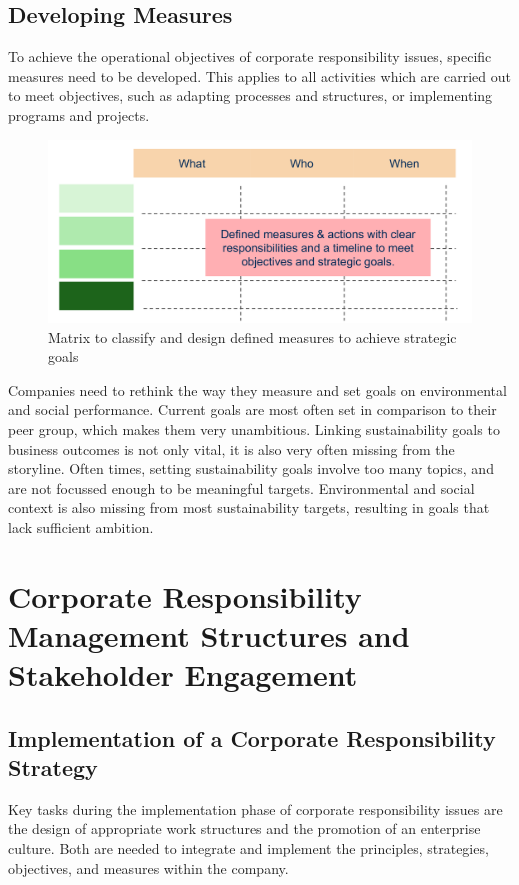 \documentclass[11pt]{article}
\theoremstyle{definition}
\begin{document}
\clearpage
\subsection{Developing Measures}
To achieve the operational objectives of corporate responsibility issues, specific measures need to be developed. This applies to all activities which are carried out to meet objectives, such as adapting processes and structures, or implementing programs and projects.
\begin{figure}[H]
	\centering
	\includegraphics[width=0.7\linewidth]{img/developing_achievable_measures}
	\caption{Matrix to classify and design defined measures to achieve strategic goals}
	\label{fig:developingachievablemeasures}
\end{figure}
Companies need to rethink the way they measure and set goals on environmental and social performance. Current goals are most often set in comparison to their peer group, which makes them very unambitious. Linking sustainability goals to business outcomes is not only vital, it is also very often missing from the storyline. Often times, setting sustainability goals involve too many topics, and are not focussed enough to be meaningful targets. Environmental and social context is also missing from most sustainability targets, resulting in goals that lack sufficient ambition.

\section{Corporate Responsibility Management Structures and Stakeholder Engagement}
\subsection{Implementation of a Corporate Responsibility Strategy}
Key tasks during the implementation phase of corporate responsibility issues are the design of appropriate work structures and the promotion of an enterprise culture. Both are needed to integrate and implement the principles, strategies, objectives, and measures within the company.
\end{document}
